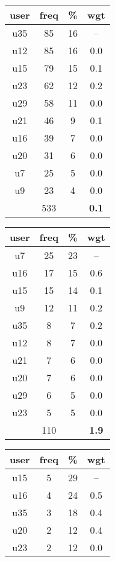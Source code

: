 \begin{appendices}
\begin{table}
\begin{tabular}{ |c|c|c|c| }
	\hline
\end{tabular}
\begin{tabular}{ |c|c|c|c| }
	\hline
	\textbf{user} & \textbf{freq} & \textbf{\%} & \textbf{wgt} \\
	\hline
	u35 & 85 & 16 & -- \\
	u12 & 85 & 16 & 0.0 \\
	u15 & 79 & 15 & 0.1 \\
	u23 & 62 & 12 & 0.2 \\
	u29 & 58 & 11 & 0.0 \\
	u21 & 46 & 9 & 0.1 \\
	u16 & 39 & 7 & 0.0 \\
	u20 & 31 & 6 & 0.0 \\
	u7 & 25 & 5 & 0.0 \\
	u9 & 23 & 4 & 0.0 \\
	 & 533 & & \textbf{0.1} \\
	\hline
\end{tabular}
\begin{tabular}{ |c|c|c|c| }
	\hline
	\textbf{user} & \textbf{freq} & \textbf{\%} & \textbf{wgt} \\
	\hline
	u7 & 25 & 23 & -- \\
	u16 & 17 & 15 & 0.6 \\
	u15 & 15 & 14 & 0.1 \\
	u9 & 12 & 11 & 0.2 \\
	u35 & 8 & 7 & 0.2 \\
	u12 & 8 & 7 & 0.0 \\
	u21 & 7 & 6 & 0.0 \\
	u20 & 7 & 6 & 0.0 \\
	u29 & 6 & 5 & 0.0 \\
	u23 & 5 & 5 & 0.0 \\
	 & 110 & & \textbf{1.9} \\
	\hline
\end{tabular}
\begin{tabular}{ |c|c|c|c| }
	\hline
	\textbf{user} & \textbf{freq} & \textbf{\%} & \textbf{wgt} \\
	\hline
	u15 & 5 & 29 & -- \\
	u16 & 4 & 24 & 0.5 \\
	u35 & 3 & 18 & 0.4 \\
	u20 & 2 & 12 & 0.4 \\
	u23 & 2 & 12 & 0.0 \\

\end{tabular}
\end{table}
\end{appendices}
